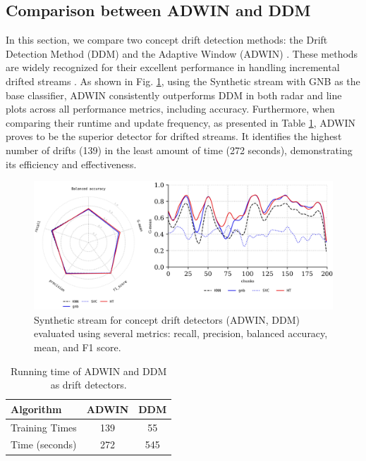 \subsection{Comparison between ADWIN and DDM}
\label{sec:compared_drift_detector}
In this section, we compare two concept drift detection methods: the Drift Detection Method (DDM) \cite{gama2004learning} and the Adaptive Window (ADWIN) \cite{gama2004learning, adams2023explainable}. These methods are widely recognized for their excellent performance in handling incremental drifted streams \cite{gama2004learning, adams2023explainable, madkour2023historical, baena2006early}. As shown in Fig. \ref{fig:res5}, using the Synthetic stream with GNB as the base classifier, ADWIN consistently outperforms DDM in both radar and line plots across all performance metrics, including accuracy. Furthermore, when comparing their runtime and update frequency, as presented in Table \ref{table:table_4}, ADWIN proves to be the superior detector for drifted streams. It identifies the highest number of drifts (139) in the least amount of time (272 seconds), demonstrating its efficiency and effectiveness.
\begin{figure}[!ht]
	\centering
	\includegraphics[width=1\linewidth]{5_Emerging/images/res4.png}
	\caption{Synthetic stream for concept drift detectors (ADWIN, DDM) evaluated using several metrics: recall, precision, balanced accuracy, mean, and F1 score.}

	\label{fig:res5}
\end{figure}
	
\begin{table}[!ht]
	\centering
	\begin{tabular}{|l|c|c|}
		\hline
	\textbf{Algorithm}     & \textbf{ADWIN} & \textbf{DDM}  \\ \hline
Training Times         & 139          & 55                   \\ \hline
Time (seconds)         & 272          & 545                   \\ \hline
	
	\end{tabular}

	\caption{Running time of ADWIN and DDM as drift detectors.}
	\label{table:table_4}
	\end{table}